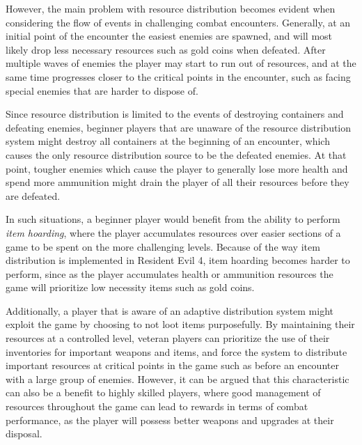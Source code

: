 However, the main problem with resource distribution becomes evident when considering the flow of events in challenging combat encounters. Generally, at an initial point of the encounter the easiest enemies are spawned, and will most likely drop less necessary resources such as gold coins when defeated. After multiple waves of enemies the player may start to run out of resources, and at the same time progresses closer to the critical points in the encounter, such as facing special enemies that are harder to dispose of.

Since resource distribution is limited to the events of destroying containers and defeating enemies, beginner players that are unaware of the resource distribution system might destroy all containers at the beginning of an encounter, which causes the only resource distribution source to be the defeated enemies. At that point, tougher enemies which cause the player to generally lose more health and spend more ammunition might drain the player of all their resources before they are defeated.

In such situations, a beginner player would benefit from the ability to perform \emph{item hoarding}, where the player accumulates resources over easier sections of a game to be spent on the more challenging levels. Because of the way item distribution is implemented in Resident Evil 4, item hoarding becomes harder to perform, since as the player accumulates health or ammunition resources the game will prioritize low necessity items such as gold coins.

Additionally, a player that is aware of an adaptive distribution system might exploit the game by choosing to not loot items purposefully. By maintaining their resources at a controlled level, veteran players can prioritize the use of their inventories for important weapons and items, and force the system to distribute important resources at critical points in the game such as before an encounter with a large group of enemies. However, it can be argued that this characteristic can also be a benefit to highly skilled players, where good management of resources throughout the game can lead to rewards in terms of combat performance, as the player will possess better weapons and upgrades at their disposal.

